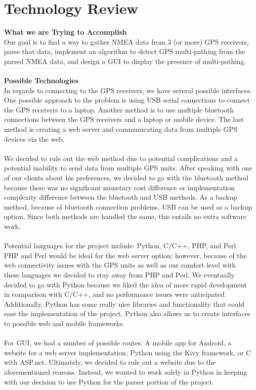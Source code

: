 \documentclass[12pt]{article}
\begin{document}
\section{Technology Review}
\textbf{What we are Trying to Accomplish} \\
Our goal is to find a way to gather NMEA data from 3 (or more) GPS receivers, parse that data, implement an algorithm to detect GPS multi-pathing from the parsed NMEA data, and design a GUI to display the presence of multi-pathing. \\ \\
\textbf{Possible Technologies} \\ 
In regards to connecting to the GPS receivers, we have several possible interfaces. One possible approach to the problem is using USB serial connections to connect the GPS receivers to a laptop. Another method is to use multiple bluetooth connections between the GPS receivers and a laptop or mobile device. The last method is creating a web server and communicating data from multiple GPS devices via the web.\\ \\
We decided to rule out the web method due to potential complications and a potential inability to send data from multiple GPS units. After speaking with one of our clients about his preferences, we decided to go with the bluetooth method because there was no significant monetary cost difference or implementation complexity difference between the bluetooth and USB methods. As a backup method, because of bluetooth connection problems, USB can be used as a backup option. Since both methods are handled the same, this entails no extra software work. \\ \\
Potential languages for the project include: Python, C/C++, PHP, and Perl. PHP and Perl would be ideal for the web server option; however, because of the web connectivity issues with the GPS units as well as our comfort level with these languages we decided to stay away from PHP and Perl. We eventually decided to go with Python because we liked the idea of more rapid development in comparison with C/C++, and no performance issues were anticipated. Additionally, Python has some really nice libraries and functionality that could ease the implementation of the project. Python also allows us to create interfaces to possible web and mobile frameworks. \\ \\
For GUI, we had a number of possible routes: A mobile app for Android, a website for a web server implementation, Python using the Kivy framework, or C with ASP.net. Ultimately, we decided to rule out a website due to the aforementioned reasons. Instead, we wanted to work solely in Python in keeping with our decision to use Python for the parser portion of the project.
\end{document}
